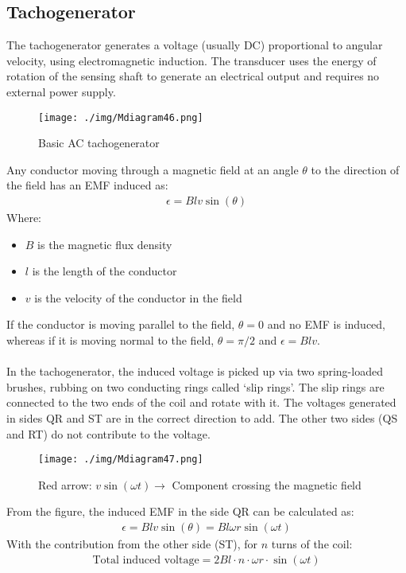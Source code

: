 \subsection{Tachogenerator}
The tachogenerator generates a voltage (usually DC) proportional to angular velocity, using electromagnetic induction. The transducer uses the energy of rotation of the sensing shaft to generate an electrical output and requires no external power supply.
\begin{figure}[H]
  \centering
  \texttt{[image: ./img/Mdiagram46.png]}
  \caption{Basic AC tachogenerator}
\end{figure}
Any conductor moving through a magnetic field at an angle $\theta$ to the direction of the field has an EMF induced as:
\begin{gather}
  \epsilon = Blv\sin(\theta)
\end{gather}
Where:
\begin{itemize}
  \item $B$ is the magnetic flux density
  \item $l$ is the length of the conductor
  \item $v$ is the velocity of the conductor in the field
\end{itemize}
If the conductor is moving parallel to the field, $\theta=0$ and no EMF is induced, whereas if it is moving normal to the field, $\theta = \pi/2$ and $\epsilon = Blv$. \\\\
In the tachogenerator, the induced voltage is picked up via two spring-loaded brushes, rubbing on two conducting rings called ‘slip rings’. The slip rings are connected to the two ends of the coil and rotate with it. The voltages generated in sides QR and ST are in the correct direction to add. The other two sides (QS and RT) do not contribute to the voltage.
\begin{figure}[H]
  \centering
  \texttt{[image: ./img/Mdiagram47.png]}
  \caption{Red arrow: $v\sin(\omega t)\longrightarrow$ Component crossing the magnetic field}
\end{figure}
From the figure, the induced EMF in the side QR can be calculated as:
\begin{gather}
  \epsilon = Blv\sin(\theta) = Bl\omega r\sin(\omega t)
\end{gather}
With the contribution from the other side (ST), for $n$ turns of the coil:
\begin{gather}
  \text{Total induced voltage} = 2Bl\cdot n \cdot \omega r \cdot \sin(\omega t)
\end{gather}
